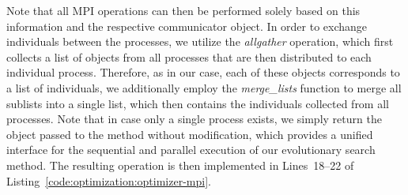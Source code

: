 Note that all MPI operations can then be performed solely based on this information and the respective communicator object.
In order to exchange individuals between the processes, we utilize the \emph{allgather} operation, which first collects a list of objects from all processes that are then distributed to each individual process.
Therefore, as in our case, each of these objects corresponds to a list of individuals, we additionally employ the \emph{merge\_lists} function to merge all sublists into a single list, which then contains the individuals collected from all processes.
Note that in case only a single process exists, we simply return the object passed to the method without modification, which provides a unified interface for the sequential and parallel execution of our evolutionary search method.
The resulting operation is then implemented in Lines~18--22 of Listing~\ref{code:optimization:optimizer-mpi}. 

